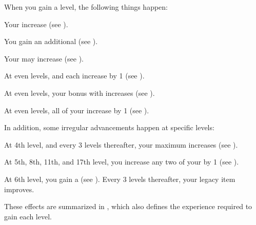   When you gain a level, the following things happen:
  \begin{raggeditemize}
    \item Your  increase (see ).
    \item You gain an additional  (see ).
    \item Your  may increase (see ).
    \item At even levels,  and  each increase by 1 (see ).
    \item At even levels, your bonus with  increases (see ).
    \item At even levels, all of your  increase by 1 (see ).
  \end{raggeditemize}

  In addition, some irregular advancements happen at specific levels:
  \begin{raggeditemize}
    \item At 4th level, and every 3 levels thereafter, your maximum  increases (see ).
    \item At 5th, 8th, 11th, and 17th level, you increase any two of your  by 1 (see ).
    \item At 6th level, you gain a  (see ).
      Every 3 levels thereafter, your legacy item improves.
  \end{raggeditemize}

  These effects are summarized in , which also defines the experience required to gain each level.

